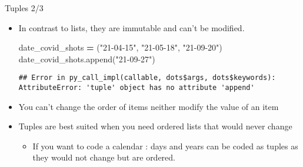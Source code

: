 \documentclass[
  8pt,
  ignorenonframetext,
]{beamer}
\newenvironment{Shaded}{\begin{snugshade}}{\end{snugshade}}
\newcommand{\NormalTok}[1]{#1}
\newcommand{\OperatorTok}[1]{\textcolor[rgb]{0.81,0.36,0.00}{\textbf{#1}}}
\newcommand{\StringTok}[1]{\textcolor[rgb]{0.31,0.60,0.02}{#1}}
\providecommand{\tightlist}{%
  \setlength{\itemsep}{0pt}\setlength{\parskip}{0pt}}
\begin{document}
\begin{frame}[fragile]{Tuples 2/3}
\protect\hypertarget{tuples-23}{}
\begin{itemize}[<+->]
\item
  In contrast to lists, they are immutable and can't be modified.

\begin{Shaded}
\begin{Highlighting}[]
\NormalTok{date\_covid\_shots }\OperatorTok{=}\NormalTok{ (}\StringTok{"21{-}04{-}15"}\NormalTok{, }\StringTok{"21{-}05{-}18"}\NormalTok{, }\StringTok{"21{-}09{-}20"}\NormalTok{)}
\NormalTok{date\_covid\_shots.append(}\StringTok{"21{-}09{-}27"}\NormalTok{)}
\end{Highlighting}
\end{Shaded}

\begin{verbatim}
## Error in py_call_impl(callable, dots$args, dots$keywords): AttributeError: 'tuple' object has no attribute 'append'
\end{verbatim}
\end{itemize}

\begin{itemize}[<+->]
\tightlist
\item
  You can't change the order of items neither modify the value of an
  item
\end{itemize}

\begin{itemize}[<+->]
\tightlist
\item
  Tuples are best suited when you need ordered lists that would never
  change

  \begin{itemize}[<+->]
  \tightlist
  \item
    If you want to code a calendar : days and years can be coded as
    tuples as they would not change but are ordered.
  \end{itemize}
\end{itemize}
\end{frame}
\end{document}
